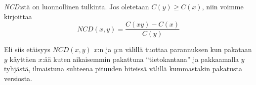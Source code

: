\documentclass[11pt,finnish]{tktltiki2}
\theoremstyle{definition}
\theoremstyle{remark}
\begin{document}
  \emph{NCD}:stä on luonnollinen tulkinta. Jos oletetaan $C(y) \geq C(x)$, niin voimme kirjoittaa
  $$ NCD(x,y) = \frac{C(xy)-C(x)}{C(y)} $$

  Eli siis etäisyys $NCD(x,y)$ $x$:n ja $y$:n välillä tuottaa parannuksen kun pakataan $y$ käyttäen $x$:ää kuten aikaisemmin pakattuna ``tietokantana'' ja pakkaamalla $y$ tyhjästä, ilmaistuna suhteena pituuden biteissä välillä kummastakin pakatusta versiosta.

%
%

%

% 





%
\end{document}
